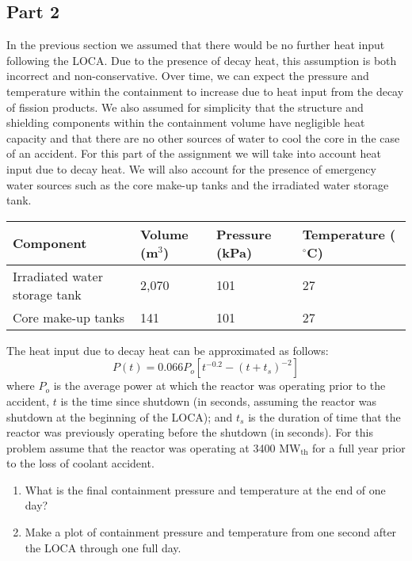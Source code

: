 \begin{fullwidth}
\section{Part 2}
In the previous section we assumed that there would be no further heat input following the LOCA.  Due to the presence of decay heat, this assumption is both incorrect and non-conservative.  Over time, we can expect the pressure and temperature within the containment to increase due to heat input from the decay of fission products.  We also assumed for simplicity that the structure and shielding components within the containment volume have negligible heat capacity and that there are no other sources of water to cool the core in the case of an accident.  For this part of the assignment we will take into account heat input due to decay heat.  We will also account for the presence of emergency water sources such as the core make-up tanks and the irradiated water storage tank.

\begin{table}
\begin{tabular}{l | l | l | l}
\toprule
\textbf{Component} & \textbf{Volume (m$^3$)} & \textbf{Pressure (kPa)} & \textbf{Temperature ($^{\circ}$C)} \\
\hline
Irradiated water storage tank & 2,070 & 101 & 27 \\
\hline
Core make-up tanks & 141 & 101 & 27 \\
\bottomrule
\end{tabular}
\end{table}
The heat input due to decay heat can be approximated as follows:
$$P(t) = 0.066P_o\left[t^{-0.2}-(t+t_s)^{-2} \right]$$
where $P_o$ is the average power at which the reactor was operating prior to the accident, $t$ is the time since shutdown (in seconds, assuming the reactor was shutdown at the beginning of the LOCA); and $t_s$ is the duration of time that the reactor was previously operating before the shutdown (in seconds).  For this problem assume that the reactor was operating at 3400 MW$_{\text{th}}$ for a full year prior to the loss of coolant accident.

\begin{enumerate}[resume]
\item What is the final containment pressure and temperature at the end of one day?

\vspace{1.0 cm}

\item Make a plot of containment pressure and temperature from one second after the LOCA through one full day.  


\end{enumerate}


\end{fullwidth}
